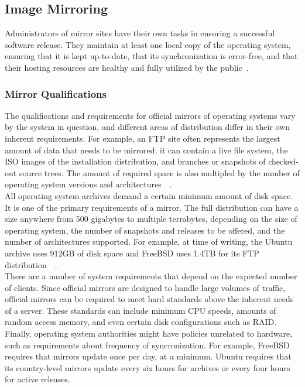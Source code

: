 \documentclass[conference]{IEEEtran}
\begin{document}
\subsection{Image Mirroring}
Administrators of mirror sites have their own tasks
in ensuring a successful software release.
They maintain at least one local copy of the operating system,
ensuring that it is kept up-to-date, that its synchronization
is error-free, and that their hosting resources are healthy
and fully utilized by the public~\cite{freebsdmirror}.

\subsubsection{Mirror Qualifications}
The qualifications and requirements for official mirrors of operating systems
vary by the system in question, and different areas of distribution
differ in their own inherent requirements.
For example, an FTP site often represents the largest amount of data
that needs to be mirrored; it can contain a live file system,
the ISO images of the installation distribution, and branches
or snapshots of checked-out source trees.
The amount of required space is also multipled
by the number of operating system versions and architectures~\cite{ubuntumirror}~\cite{freebsdrequirements}.\\
\indent All operating system archives demand a certain minimum
amount of disk space. It is one of the primary requirements of a mirror.
The full distribution can have a size anywhere from 500 gigabytes to
multiple terrabytes, depending on the size of operating system,
the number of snapshots and releases to be offered, and the number of
architectures supported. For example, at time of writing,
the Ubuntu archive uses 912GB of disk space and FreeBSD uses 1.4TB for its FTP distribution~\cite{ubuntumirror}~\cite{freebsdrequirements}.\\
\indent There are a number of system requirements that depend on
the expected number of clients. Since official mirrors are designed
to handle large volumes of traffic, official mirrors can be required to
meet hard standards above the inherent needs of a server.
These standards can include minimum CPU speeds, amounts of random access
memory, and even certain disk configurations such as RAID.\\
\indent Finally, operating system authorities might have policies
unrelated to hardware, such as requirements about frequency of syncronization.
For example, FreeBSD requires that mirrors update once per day, at a minimum. Ubuntu requires that its country-level mirrors
update every six hours for archives or every four hours for active releases.
\end{document}
